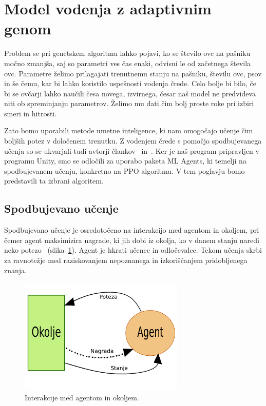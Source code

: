 \section{Model vodenja z adaptivnim genom}

Problem se pri genetskem algoritmu lahko pojavi, ko se število ovc na pašniku močno zmanjša, saj so parametri ves čas enaki, odvisni le od začetnega števila ovc. Parametre želimo prilagajati trenutnemu stanju na pašniku, številu ovc, psov in še čemu, kar bi lahko koristilo uspešnosti vodenja črede. Celo bolje bi bilo, če bi se ovčarji lahko naučili česa novega, izvirnega, česar naš model ne predvideva niti ob spreminjanju parametrov. Želimo mu dati čim bolj proste roke pri izbiri smeri in hitrosti.

Zato bomo uporabili metode umetne inteligence, ki nam omogočajo učenje čim boljših potez v določenem trenutku. Z vodenjem črede s pomočjo spodbujevanega učenja so se ukvarjali tudi avtorji člankov~\cite{obstacles} in~\cite{sarsa}. Ker je naš program pripravljen v programu Unity, smo se odločili za uporabo paketa ML Agents, ki temelji na spodbujevanem učenju, konkretno na PPO algoritmu. V tem poglavju bomo predstavili ta izbrani algoritem.

\subsection{Spodbujevano učenje}

Spodbujevano učenje je osredotočeno na interakcijo med agentom in okoljem, pri čemer agent maksimizira nagrade, ki jih dobi iz okolja, ko v danem stanju naredi neko potezo~\cite{reinforcement} (slika~\ref{fig:reinforcement}). Agent je hkrati učenec in odločevalec. Tekom učenja skrbi za ravnotežje med raziskovanjem nepoznanega in izkoriščanjem pridobljenega znanja.

\begin{figure}[ht]  %
	\centering
	\includegraphics[width=0.7\textwidth]{../poglavja/images/reinforcement.pdf}
	\caption[Agent in okolje pri spodbujevanem učenju]{Interakcije med agentom in okoljem.} %
	\label{fig:reinforcement}
\end{figure}

